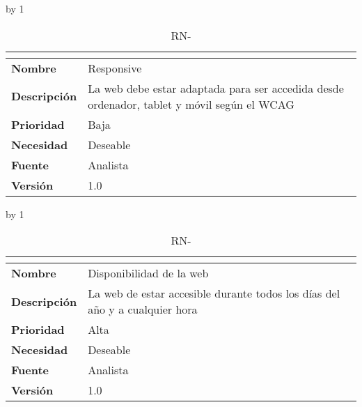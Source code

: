 \advance\rn by 1
\begin{table}[H]
	\caption{RN-\number\rn}
	\begin{tabular}{|l|p{}|}
		\hline
		\multicolumn{2}{|c|}{\cellcolor[HTML]{BFBFBF}{\color[HTML]{000000} \textbf{RN-\number\rn}}} \\ \hline
		\textbf{Nombre}      & Responsive                                                                                                                  \\ \hline
		\textbf{Descripción} & La web debe estar adaptada para ser accedida desde ordenador, tablet y móvil según el WCAG \cite{initiative_wai_web_nodate} \\ \hline
		\textbf{Prioridad}   & Baja                                                                                                                        \\ \hline
		\textbf{Necesidad}   & Deseable                                                                                                                    \\ \hline
		\textbf{Fuente}      & Analista                                                                                                                    \\ \hline
		\textbf{Versión}     & 1.0                                                                                                                         \\ \hline
	\end{tabular}
\end{table}
\advance\rn by 1
\begin{table}[H]
	\caption{RN-\number\rn}
	\begin{tabular}{|l|p{}|}
		\hline
		\multicolumn{2}{|c|}{\cellcolor[HTML]{BFBFBF}{\color[HTML]{000000} \textbf{RN-\number\rn}}} \\ \hline
		\textbf{Nombre}      & Disponibilidad de la web                                                    \\ \hline
		\textbf{Descripción} & La web de estar accesible durante todos los días del año y a cualquier hora \\ \hline
		\textbf{Prioridad}   & Alta                                                                        \\ \hline
		\textbf{Necesidad}   & Deseable                                                                    \\ \hline
		\textbf{Fuente}      & Analista                                                                    \\ \hline
		\textbf{Versión}     & 1.0                                                                         \\ \hline
	\end{tabular}
\end{table}
